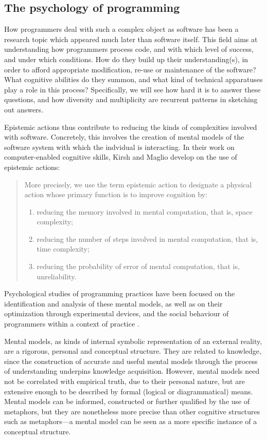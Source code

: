 \subsection{The psychology of programming} %

How programmers deal with such a complex object as software has been a research topic which appeared much later than software itself. This field aims at understanding how programmers process code, and with which level of success, and under which conditions. How do they build up their understanding(s), in order to afford appropriate modification, re-use or maintenance of the software? What cognitive abilities do they summon, and what kind of technical apparatuses play a role in this process? Specifically, we will see how hard it is to answer these questions, and how diversity and multiplicity are recurrent patterns in sketching out answers.

Epistemic actions thus contribute to reducing the kinds of complexities involved with software. Concretely, this involves the creation of mental models of the software system with which the indvidual is interacting. In their work on computer-enabled cognitive skills, Kirsh and Maglio develop on the use of epistemic actions:

\begin{quote}
    More precisely, we use the term epistemic action to designate a physical action whose primary function is to improve cognition by:
    \begin{enumerate}
        \item reducing the memory involved in mental computation, that is, space complexity;
        \item reducing the number of steps involved in mental computation, that is, time complexity;
        \item reducing the probability of error of mental computation, that is, unreliability.
    \end{enumerate}
    \citep{kirsh_distinguishing_1994}
\end{quote}

Psychological studies of programming practices have been focused on the identification and analysis of these mental models, as well as on their optimization through experimental devices, and the social behaviour of programmers within a context of practice \citep{weinberg_psychology_1998}.

Mental models, as kinds of internal symbolic representation of an external reality, are a rigorous, personal and conceptual structure. They are related to knowledge, since the construction of accurate and useful mental models through the process of understanding underpins knowledge acquisition. However, mental models need not be correlated with empirical truth, due to their personal nature, but are extensive enough to be described by formal (logical or diagrammatical) means. Mental models can be informed, constructed or further qualified by the use of metaphors, but they are nonetheless more precise than other cognitive structures such as metaphors—a mental model can be seen as a more specific instance of a conceptual structure.

